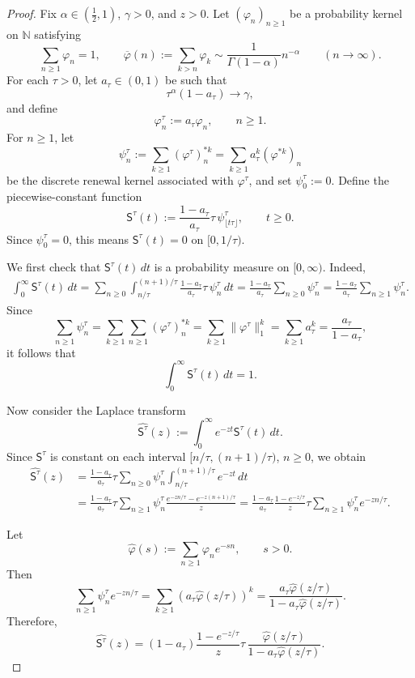 \documentclass[letterpaper]{article}
\numberwithin{equation}{section}
\theoremstyle{definition}
\theoremstyle{remark}
\begin{document}
\begin{proof}

Fix $\alpha\in(\frac12,1)$, $\gamma>0$, and $z>0$. Let $(\varphi_n)_{n\ge1}$ be a probability kernel on $\mathbb N$ satisfying
\[
\sum_{n\ge1}\varphi_n=1,
\qquad
\overline\varphi(n):=\sum_{k>n}\varphi_k
\sim \frac{1}{\Gamma(1-\alpha)}n^{-\alpha}
\qquad (n\to\infty).
\]
For each $\tau>0$, let $a_\tau\in(0,1)$ be such that
\[
\tau^\alpha(1-a_\tau)\to\gamma,
\]
and define
\[
\varphi_n^\tau:=a_\tau\varphi_n,\qquad n\ge1.
\]
For $n\ge1$, let
\[
\psi_n^\tau:=\sum_{k\ge1}(\varphi^\tau)^{*k}_n
=\sum_{k\ge1}a_\tau^k(\varphi^{*k})_n
\]
be the discrete renewal kernel associated with $\varphi^\tau$, and set
$\psi_0^\tau:=0$.
Define the piecewise-constant function
\[
\mathsf S^\tau(t):=\frac{1-a_\tau}{a_\tau}\tau\,\psi^\tau_{\lfloor t\tau\rfloor},
\qquad t\ge0.
\]
Since $\psi_0^\tau=0$, this means $\mathsf S^\tau(t)=0$ on $[0,1/\tau)$.

We first check that $\mathsf S^\tau(t)\,dt$ is a probability measure on $[0,\infty)$. Indeed,
\begin{align*}
\int_0^\infty \mathsf S^\tau(t)\,dt
=
\sum_{n\ge0}\int_{n/\tau}^{(n+1)/\tau}\frac{1-a_\tau}{a_\tau}\tau\,\psi_n^\tau\,dt
=
\frac{1-a_\tau}{a_\tau}\sum_{n\ge0}\psi_n^\tau
=
\frac{1-a_\tau}{a_\tau}\sum_{n\ge1}\psi_n^\tau.
\end{align*}
Since
\[
\sum_{n\ge1}\psi_n^\tau
=
\sum_{k\ge1}\sum_{n\ge1}(\varphi^\tau)^{*k}_n
=
\sum_{k\ge1}\|\varphi^\tau\|_1^k
=
\sum_{k\ge1}a_\tau^k
=
\frac{a_\tau}{1-a_\tau},
\]
it follows that
\[
\int_0^\infty \mathsf S^\tau(t)\,dt=1.
\]

Now consider the Laplace transform
\[
\widehat{\mathsf S^\tau}(z):=\int_0^\infty e^{-zt}\mathsf S^\tau(t)\,dt.
\]
Since $\mathsf S^\tau$ is constant on each interval $[n/\tau,(n+1)/\tau)$, $n\ge0$, we obtain
\begin{align*}
\widehat{\mathsf S^\tau}(z)
&=
\frac{1-a_\tau}{a_\tau}\tau\sum_{n\ge0}\psi_n^\tau
\int_{n/\tau}^{(n+1)/\tau}e^{-zt}\,dt
\\
&=
\frac{1-a_\tau}{a_\tau}\tau\sum_{n\ge1}\psi_n^\tau
\frac{e^{-zn/\tau}-e^{-z(n+1)/\tau}}{z}
=
\frac{1-a_\tau}{a_\tau}\frac{1-e^{-z/\tau}}{z}\tau
\sum_{n\ge1}\psi_n^\tau e^{-zn/\tau}.
\end{align*}

Let
\[
\hat\varphi(s):=\sum_{n\ge1}\varphi_n e^{-sn},
\qquad s>0.
\]
Then
\[
\sum_{n\ge1}\psi_n^\tau e^{-zn/\tau}
=
\sum_{k\ge1}\left(a_\tau\hat\varphi(z/\tau)\right)^k
=
\frac{a_\tau\hat\varphi(z/\tau)}{1-a_\tau\hat\varphi(z/\tau)}.
\]
Therefore,
\begin{equation}\label{eq:laplace-Stau-proof}
\widehat{\mathsf S^\tau}(z)
=
(1-a_\tau)\frac{1-e^{-z/\tau}}{z}\tau\,
\frac{\hat\varphi(z/\tau)}{1-a_\tau\hat\varphi(z/\tau)}.
\end{equation}


\end{proof}
\end{document}
